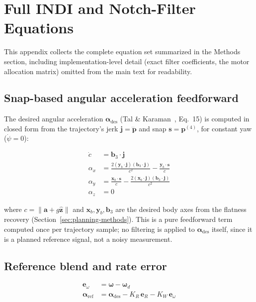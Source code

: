 \documentclass[11pt,a4paper]{article}
\begin{document}
\clearpage
\appendix
\section{Full INDI and Notch-Filter Equations}
\label{sec:appendix-equations}

This appendix collects the complete equation set summarized in the Methods section, including
implementation-level detail (exact filter coefficients, the motor allocation matrix) omitted from
the main text for readability.

\subsection{Snap-based angular acceleration feedforward}

The desired angular acceleration $\boldsymbol{\alpha}_{\mathrm{des}}$ (Tal \& Karaman~\cite{tal2020}, Eq.~15) is
computed in closed form from the trajectory's jerk $\mathbf{j}=\dddot{\mathbf{p}}$ and snap
$\mathbf{s}=\mathbf{p}^{(4)}$, for constant yaw ($\dot\psi=0$):

\begin{align}
  \dot{c} &= \mathbf{b}_3\cdot\mathbf{j} \\
  \alpha_x &= \frac{2(\mathbf{y}_b\cdot\mathbf{j})(\mathbf{b}_3\cdot\mathbf{j})}{c^2}
    - \frac{\mathbf{y}_b\cdot\mathbf{s}}{c} \\
  \alpha_y &= \frac{\mathbf{x}_b\cdot\mathbf{s}}{c}
    - \frac{2(\mathbf{x}_b\cdot\mathbf{j})(\mathbf{b}_3\cdot\mathbf{j})}{c^2} \\
  \alpha_z &= 0
\end{align}

where $c=\|\mathbf{a}+g\hat{\mathbf{z}}\|$ and $\mathbf{x}_b,\mathbf{y}_b,\mathbf{b}_3$ are the
desired body axes from the flatness recovery (Section~\ref{sec:planning-methods}). This is a pure
feedforward term computed once per trajectory sample; no filtering is applied to
$\boldsymbol{\alpha}_{\mathrm{des}}$ itself, since it is a planned reference signal, not a noisy
measurement.

\subsection{Reference blend and rate error}

\begin{align}
  \mathbf{e}_\omega &= \boldsymbol{\omega} - \boldsymbol{\omega}_d \\
  \boldsymbol{\alpha}_{\mathrm{ref}} &= \boldsymbol{\alpha}_{\mathrm{des}}
    - K_R\,\mathbf{e}_R - K_W\,\mathbf{e}_\omega
\end{align}
\end{document}
